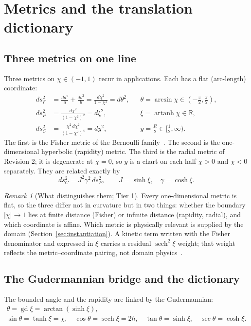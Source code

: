 \documentclass[11pt]{article}
\theoremstyle{definition}
\theoremstyle{remark}
\newtheorem{remark}{Remark}
\newcommand{\artanh}{\operatorname{artanh}}
\newcommand{\gd}{\operatorname{gd}}
\newcommand{\sech}{\operatorname{sech}}
\begin{document}
\section{Metrics and the translation dictionary}\label{sec:dictionary}

\subsection{Three metrics on one line}
Three metrics on $\chi\in(-1,1)$ recur in applications. Each has a flat (arc-length)
coordinate:
\begin{align}
ds_F^2&=\frac{da^2}{a}+\frac{db^2}{b}=\frac{d\chi^2}{1-\chi^2}=d\theta^2,
&&\theta=\arcsin\chi\in(-\tfrac\pi2,\tfrac\pi2),\label{eq:fisher}\\
ds_P^2&=\frac{d\chi^2}{(1-\chi^2)^2}=d\xi^2,&&\xi=\artanh\chi\in\mathbb R,\label{eq:rapid}\\
ds_C^2&=\frac{\chi^2\,d\chi^2}{(1-\chi^2)^4}=dy^2,&&y=\tfrac R2\in[\tfrac12,\infty).\label{eq:radial}
\end{align}
The first is the Fisher metric of the Bernoulli family~\cite{Fisher1925,Rao1945}. The second
is the one-dimensional hyperbolic (rapidity) metric. The third is the radial metric of
Revision 2; it is degenerate at $\chi=0$, so $y$ is a chart on each half $\chi>0$ and
$\chi<0$ separately. They are related exactly by
\begin{equation}\label{eq:inversion}
ds_C^2=J^2\gamma^2\,ds_P^2,\qquad J=\sinh\xi,\quad\gamma=\cosh\xi .
\end{equation}

\begin{remark}[What distinguishes them; Tier 1]\label{rem:flat}
Every one-dimensional metric is flat, so the three differ not in curvature but in two
things: whether the boundary $|\chi|\to1$ lies at finite distance (Fisher) or infinite
distance (rapidity, radial), and which coordinate is affine. Which metric is physically
relevant is supplied by the domain (Section~\ref{sec:instantiation}). A kinetic term written
with the Fisher denominator and expressed in $\xi$ carries a residual $\sech^2\xi$ weight;
that weight reflects the metric--coordinate pairing, not domain physics~\cite{DeJesus2026EP}.
\end{remark}

\subsection{The Gudermannian bridge and the dictionary}
The bounded angle and the rapidity are linked by the Gudermannian:
\begin{equation}\label{eq:gd}
\begin{gathered}
\theta=\gd\xi=\arctan(\sinh\xi),\\
\sin\theta=\tanh\xi=\chi,\quad \cos\theta=\sech\xi=2h,\quad \tan\theta=\sinh\xi,\quad\sec\theta=\cosh\xi .
\end{gathered}
\end{equation}
\end{document}
